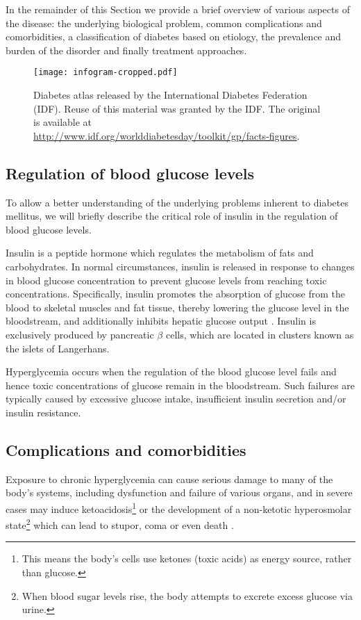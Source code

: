 In the remainder of this Section we provide a brief overview of various aspects of the disease: the underlying biological problem, common complications and comorbidities, a classification of diabetes based on etiology, the prevalence and burden of the disorder and finally treatment approaches.

\begin{figure}[p]
  \centering
  \texttt{[image: infogram-cropped.pdf]}
  \caption{Diabetes atlas released by the International Diabetes Federation (IDF). Reuse of this material was granted by the IDF. The original is available at \url{http://www.idf.org/worlddiabetesday/toolkit/gp/facts-figures}.} 
  \label{intro:diabetes-infogram}
\end{figure}



\subsection{Regulation of blood glucose levels}
To allow a better understanding of the underlying problems inherent to diabetes mellitus, we will briefly describe the critical role of insulin in the regulation of blood glucose levels.

Insulin is a peptide hormone which regulates the metabolism of fats and carbohydrates. In normal circumstances, insulin is released in response to changes in blood glucose concentration to prevent glucose levels from reaching toxic concentrations. Specifically, insulin promotes the absorption of glucose from the blood to skeletal muscles and fat tissue, thereby lowering the glucose level in the bloodstream, and additionally inhibits hepatic glucose output \citep{sonksen2000insulin}. Insulin is exclusively produced by pancreatic $\beta$ cells, which are located in clusters known as the islets of Langerhans. 

Hyperglycemia occurs when the regulation of the blood glucose level fails and hence toxic concentrations of glucose remain in the bloodstream. Such failures are typically caused by excessive glucose intake, insufficient insulin secretion and/or insulin resistance. 


\subsection{Complications and comorbidities}
Exposure to chronic hyperglycemia can cause serious damage to many of the body's systems, including dysfunction and failure of various organs, and in severe cases may induce ketoacidosis\footnote{This means the body's cells use ketones (toxic acids) as energy source, rather than glucose.} or the development of a non-ketotic hyperosmolar state\footnote{When blood sugar levels rise, the body attempts to excrete excess glucose via urine.} which can lead to stupor, coma or even death \citep{alberti1998definition}. 

